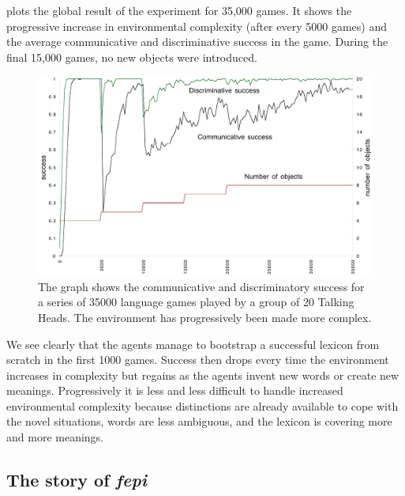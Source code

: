  plots the global 
result of the experiment for 35,000 games. It shows the progressive 
increase in environmental complexity (after every 
5000 games) and the average communicative and discriminative
success in the game. During the final 15,000 games, no new
objects were introduced. 

\begin{figure}[htbp]
  \centerline{\includegraphics[width=.80\textwidth]{chap7/figs/globalsuccess.pdf}}
\caption{\label{globalsuccess}The graph shows the communicative
and discriminatory success for a series of 35000 language games
played by a group of 20 Talking Heads. The environment 
has progressively been made more complex.}
\end{figure}

We see clearly that the agents manage to bootstrap 
a successful lexicon from scratch in the first 1000 
games. Success then drops every time
the environment increases in complexity but regains as the 
agents invent new words or create new meanings. Progressively 
it is less and less difficult to handle increased
environmental complexity because distinctions are 
already available to cope with the novel
situations, words are less ambiguous, 
and the lexicon is covering more and more meanings. 

\subsection{The story of \textit{fepi}}

